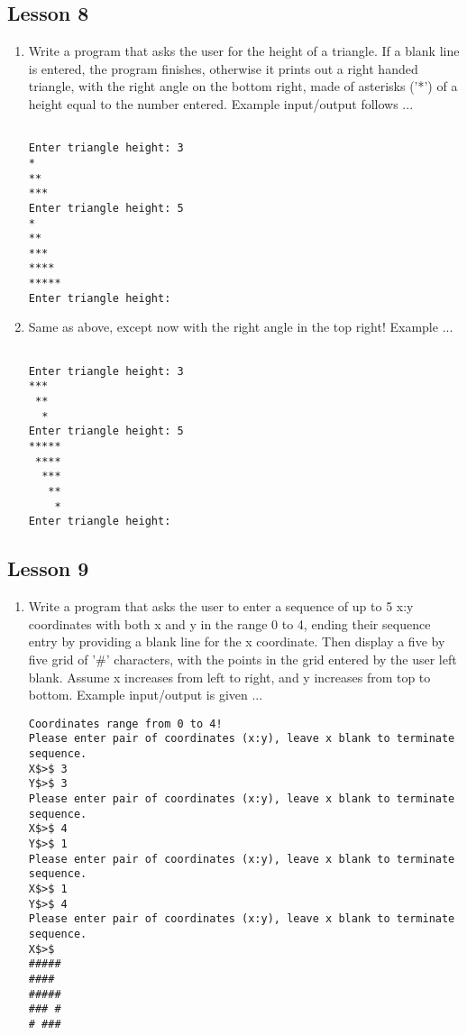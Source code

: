 \subsection{Lesson 8}

\begin{enumerate}
	\item Write a program that asks the user for the height of a triangle.    If a blank line is entered, the program finishes, otherwise it    prints out a right handed triangle, with the right angle on the    bottom right, made of asterisks ('*') of a height equal to the    number entered. Example input/output follows ...      
\begin{lstlisting}

Enter triangle height: 3
*
**
***
Enter triangle height: 5
*
**
***
****
*****
Enter triangle height: 
\end{lstlisting}
	\item Same as above, except now with the right angle in the top right! Example ...      
\begin{lstlisting}

Enter triangle height: 3
***
 **
  *
Enter triangle height: 5
*****
 ****
  ***
   **
    *
Enter triangle height: 
\end{lstlisting}
\end{enumerate}

\subsection{Lesson 9}

\begin{enumerate}
	\item Write a program that asks the user to enter a sequence of up to    5 x:y coordinates with both x and y in the range 0 to 4, ending    their sequence entry by providing a blank line for the x    coordinate. Then display a five by five grid of '\#' characters,    with the points in the grid entered by the user left blank. Assume    x increases from left to right, and y increases from top to bottom.    Example input/output is given ...          
\begin{lstlisting}
Coordinates range from 0 to 4!
Please enter pair of coordinates (x:y), leave x blank to terminate sequence.
X$>$ 3
Y$>$ 3
Please enter pair of coordinates (x:y), leave x blank to terminate sequence.
X$>$ 4
Y$>$ 1
Please enter pair of coordinates (x:y), leave x blank to terminate sequence.
X$>$ 1
Y$>$ 4
Please enter pair of coordinates (x:y), leave x blank to terminate sequence.
X$>$
#####
#### 
#####
### #
# ###
\end{lstlisting}
\end{enumerate}

